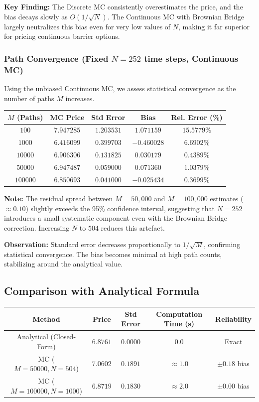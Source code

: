 \documentclass{report}
\begin{document}
\textbf{Key Finding:} The Discrete MC consistently overestimates the price, and the bias decays slowly as $O(1/\sqrt{N})$. The Continuous MC with Brownian Bridge largely neutralizes this bias even for very low values of $N$, making it far superior for pricing continuous barrier options.

\subsubsection{Path Convergence (Fixed $N = 252$ time steps, Continuous MC)}

Using the unbiased Continuous MC, we assess statistical convergence as the number of paths $M$ increases.

\begin{center}
\begin{tabular}{ccccc}
\toprule
$M$ (Paths) & MC Price & Std Error & Bias & Rel. Error (\%) \\
\midrule
$100$ & $7.947285$ & $1.203531$ & $1.071159$ & $15.5779\%$ \\
$1000$ & $6.416099$ & $0.399703$ & $-0.460028$ & $6.6902\%$ \\
$10000$ & $6.906306$ & $0.131825$ & $0.030179$ & $0.4389\%$ \\
$50000$ & $6.947487$ & $0.059000$ & $0.071360$ & $1.0379\%$ \\
$100000$ & $6.850693$ & $0.041000$ & $-0.025434$ & $0.3699\%$ \\
\bottomrule
\end{tabular}
\end{center}

\textbf{Note:} The residual spread between $M=50{,}000$ and $M=100{,}000$ estimates ($\approx 0.10$) slightly exceeds the 95\% confidence interval, suggesting that $N=252$ introduces a small systematic component even with the Brownian Bridge correction. Increasing $N$ to $504$ reduces this artefact.

\textbf{Observation:} Standard error decreases proportionally to $1/\sqrt{M}$, confirming statistical convergence. The bias becomes minimal at high path counts, stabilizing around the analytical value.

\subsection{Comparison with Analytical Formula}

\begin{center}
\begin{tabular}{ccccc}
\toprule
Method & Price & Std Error & Computation Time (s) & Reliability \\
\midrule
Analytical (Closed-Form) & $6.8761$ & $0.0000$ & $0.0$ & Exact \\
MC ($M=50000, N=504$) & $7.0602$ & $0.1891$ & $\approx 1.0$ & $\pm 0.18$ bias \\
MC ($M=100000, N=1000$) & $6.8719$ & $0.1830$ & $\approx 2.0$ & $\pm 0.00$ bias \\
\bottomrule
\end{tabular}
\end{center}
\end{document}
